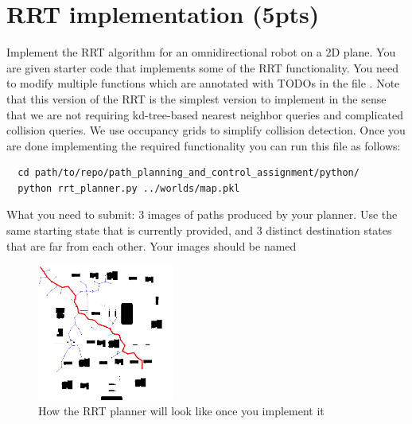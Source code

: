\documentclass[11pt, a4paper]{article}
\begin{document}
\section{RRT implementation (5pts)}
Implement the RRT algorithm for an omnidirectional robot on a 2D plane. You are given starter code
that implements some of the RRT functionality. You need to modify multiple functions which are annotated with TODOs in 
the file . Note that this version of the RRT is the simplest version to implement in the sense that we 
are not requiring kd-tree-based nearest neighbor queries and complicated collision queries. We use occupancy grids to simplify 
collision detection. Once you are done implementing the required functionality you can run this file as follows:
\begin{verbatim}
  cd path/to/repo/path_planning_and_control_assignment/python/
  python rrt_planner.py ../worlds/map.pkl
\end{verbatim}
\noindent What you need to submit: 3 images of paths produced by your planner. Use the same starting state that is currently provided, and 
3 distinct destination states that are far from each other. Your images should be named 

\begin{figure}
  \begin{center}
    \includegraphics[width=0.4\textwidth]{rrt}
  \end{center}
  \caption{How the RRT planner will look like once you implement it}
\end{figure}
\end{document}
